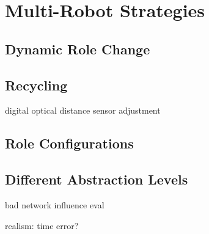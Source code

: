\section{Multi-Robot Strategies}
\label{sec:multi_robot_strategies}
\subsection{Dynamic Role Change}
\subsection{Recycling}
digital optical distance sensor adjustment
\subsection{Role Configurations}
\subsection{Different Abstraction Levels}
bad network influence eval




realism: time error?

